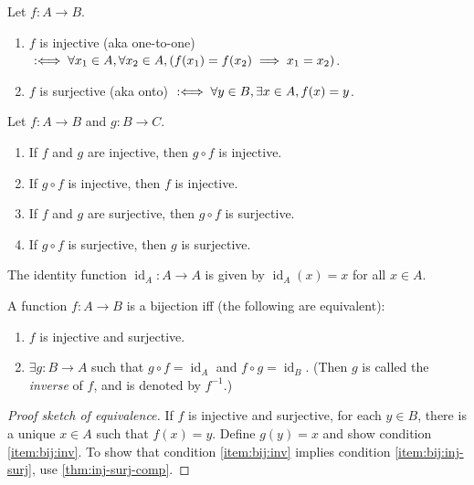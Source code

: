 \documentclass[a4paper, 12pt, fleqn]{article}
\DeclareMathOperator{\idFunc}{id}
\begin{document}
\begin{definition}
Let $f: A \to B$.
\begin{enumerate}
\item $f$ is injective (aka one-to-one)
    $\;:\Longleftrightarrow\; \forall x_1 \in A, \forall x_2 \in A, (f(x_1) = f(x_2) \implies x_1 = x_2)$.
\item $f$ is surjective (aka onto)
    $\;:\Longleftrightarrow\; \forall y \in B, \exists x \in A, f(x) = y$.
\end{enumerate}
\end{definition}

\begin{lemma}[Composition]
\label{thm:inj-surj-comp}
Let $f: A \to B$ and $g: B \to C$.
\begin{enumerate}
\item If $f$ and $g$ are injective, then $g \circ f$ is injective.
\item If $g \circ f$ is injective, then $f$ is injective.
\item If $f$ and $g$ are surjective, then $g \circ f$ is surjective.
\item If $g \circ f$ is surjective, then $g$ is surjective.
\end{enumerate}
\end{lemma}

\begin{definition}[Identity]
The identity function $\idFunc_A: A \to A$ is given by $\idFunc_A(x) = x$ for all $x \in A$.
\end{definition}

\begin{definition}[Bijection]
A function $f: A \to B$ is a bijection iff (the following are equivalent):
\begin{enumerate}
\item \label{item:bij:inj-surj}$f$ is injective and surjective.
\item \label{item:bij:inv}$\exists g: B \to A$ such that $g \circ f = \idFunc_A$ and $f \circ g = \idFunc_B$.
    (Then $g$ is called the \emph{inverse} of $f$, and is denoted by $f^{-1}$.)
\end{enumerate}
\end{definition}
\begin{proof}[Proof sketch of equivalence]
If $f$ is injective and surjective, for each $y \in B$, there is a unique $x \in A$
such that $f(x) = y$. Define $g(y) = x$ and show condition \ref{item:bij:inv}.
To show that condition \ref{item:bij:inv} implies condition \ref{item:bij:inj-surj},
use \cref{thm:inj-surj-comp}.
\end{proof}
\end{document}
